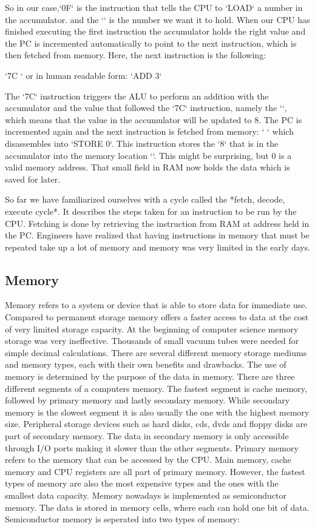 So in our case,`\x0F` is the instruction that tells the CPU to `LOAD` a number in the accumulator.
and the `` is the number we want it to hold. When our CPU has finished executing the first
instruction the accumulator holds the right value and the PC is incremented automatically to point
to the next instruction, which is then fetched from memory. Here, the next instruction is the
following:

`\x7C ` or in human readable form:  `ADD 3`

The `\x7C` instruction triggers the ALU to perform an addition with the accumulator and
the value that followed the `\x7C` instruction, namely the ``, which means that the value
in the accumulator will be updated to 8. The PC is incremented again and the next instruction is
fetched from memory: ` ` which disassembles into `STORE 0`. This instruction stores the `8` 
that is in the accumulator into the memory location ``. This might be surprising, but 0 is a
valid memory address. That small field in RAM now holds the data which is saved for later.

So far we have familiarized ourselves with a cycle called the *fetch, decode, execute cycle*. It 
describes the steps taken for an instruction to be run by the CPU. Fetching is done by retrieving
the instruction from RAM at address held in the PC. Engineers have realized that having instructions in memory that must be repeated take up a lot of memory
and memory was very limited in the early days.

\subsection{Memory}

Memory refers to a system or device that is able to store data for immediate use. Compared to permanent 
storage memory offers a faster access to data at the cost of very limited storage capacity. At the 
beginning of computer science memory storage was very ineffective. Thousands of small vacuum tubes 
were needed for simple decimal calculations. There are several different memory storage mediums and memory 
types, each with their own benefits and drawbacks. The use of memory is determined by the purpose of
the data in memory. There are three different segments of a computers memory. The fastest segment is cache
memory, followed by primary memory and lastly secondary memory. While secondary memory is the slowest segment it is
also usually the one with the highest memory size. Peripheral storage devices such as hard disks, cds, dvds and floppy disks
are part of secondary memory. The data in secondary memory is only accessible through I/O ports making 
it slower than the other segments. Primary memory refers to the memory that can be accessed by the CPU. Main memory, 
cache memory and CPU registers are all part of primary memory. However, the fastest types of memory 
are also the most expensive types and the ones with the smallest data capacity. Memory nowadays is 
implemented as semiconductor memory. The data is stored in memory cells, where each can hold one bit 
of data. Semiconductor memory is seperated into two types of memory:


